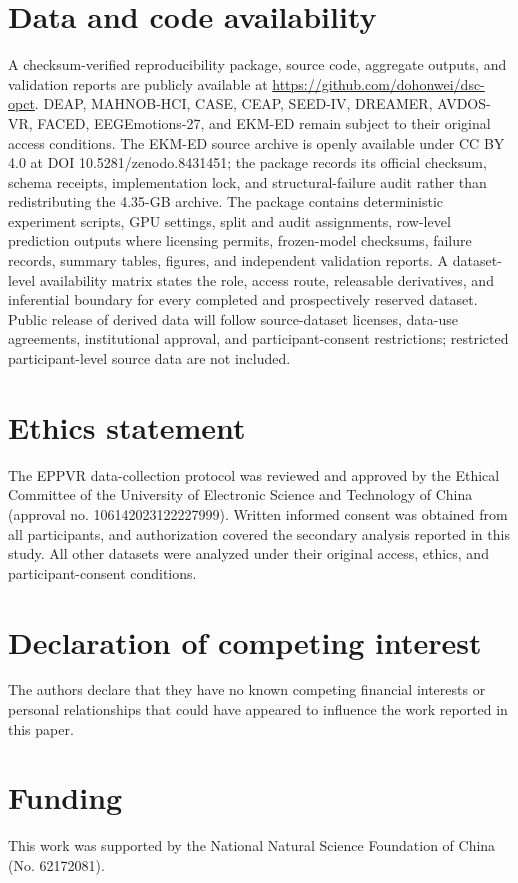 \documentclass[preprint,12pt]{elsarticle}
\begin{document}
\section*{Data and code availability}


A checksum-verified reproducibility package, source code, aggregate outputs, and validation reports are publicly available at \url{https://github.com/dohonwei/dsc-opct}. DEAP, MAHNOB-HCI, CASE, CEAP, SEED-IV, DREAMER, AVDOS-VR, FACED, EEGEmotions-27, and EKM-ED remain subject to their original access conditions. The EKM-ED source archive is openly available under CC BY 4.0 at DOI 10.5281/zenodo.8431451; the package records its official checksum, schema receipts, implementation lock, and structural-failure audit rather than redistributing the 4.35-GB archive. The package contains deterministic experiment scripts, GPU settings, split and audit assignments, row-level prediction outputs where licensing permits, frozen-model checksums, failure records, summary tables, figures, and independent validation reports. A dataset-level availability matrix states the role, access route, releasable derivatives, and inferential boundary for every completed and prospectively reserved dataset. Public release of derived data will follow source-dataset licenses, data-use agreements, institutional approval, and participant-consent restrictions; restricted participant-level source data are not included.

\section*{Ethics statement}

The EPPVR data-collection protocol was reviewed and approved by the Ethical Committee of the University of Electronic Science and Technology of China (approval no. 106142023122227999). Written informed consent was obtained from all participants, and authorization covered the secondary analysis reported in this study. All other datasets were analyzed under their original access, ethics, and participant-consent conditions.

\section*{Declaration of competing interest}

The authors declare that they have no known competing financial interests or personal relationships that could have appeared to influence the work reported in this paper.

\section*{Funding}

This work was supported by the National Natural Science Foundation of China (No. 62172081).



\end{document}
